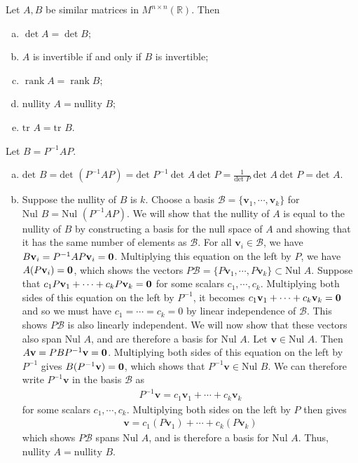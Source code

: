 \documentclass[12pt,letterpaper,reqno]{article}
\numberwithin{equation}{section}
\newcommand{\R}{\ensuremath{\mathbb R}}
\newcommand{\bv}{\mathbf{v}}
\newcommand{\nullity}{\text{nullity }}
\DeclareMathOperator{\rank}{rank}
\begin{document}
\begin{thm}\label{thm:similarity_invariants}
	Let $A,B$ be similar matrices in $M^{n \times n}(\R)$. Then
	\begin{enumerate}[(a)]
		\item $\det A=\det B$;
		\item $A$ is invertible if and only if $B$ is invertible;
		\item $\rank A= \rank B$;
		\item $\nullity A=\nullity B$;
		\item $\text{tr } A=\text{tr } B$.
	\end{enumerate}
\end{thm}

\newpage

\begin{pf}
Let $B=P^{-1}AP$.
	\begin{enumerate}[(a)]
		\item $\text{det }B=\text{det }(P^{-1}AP)=\text{det }P^{-1} \ \text{det }A \ \text{det }P=\frac{1}{\text{det }P} \ \text{det }A \ \text{det }P=\text{det }A$.
		\item Suppose the nullity of $B$ is $k$. Choose a basis $\mathcal{B}=\{\bv_1, \cdots, \bv_k\}$ for $\text{Nul }B=\text{Nul }(P^{-1}AP)$. We will show  that the nullity of $A$ is equal to the nullity of $B$ by constructing a basis for the null space of $A$ and showing that it has the same number of elements as $\mathcal{B}$. For all $\bv_i \in \mathcal{B}$, we have $B\bv_i=P^{-1}AP\bv_i={\bf 0}$. Multiplying this equation on the left by $P$, we have $A(P\bv_i)={\bf 0}$, which shows the vectors $P\mathcal{B}=\{P\bv_1,\cdots,P\bv_k\} \subset \text{Nul }A$. Suppose that $c_1P\bv_1+\cdots + c_kP\bv_k={\bf 0}$ for some scalars $c_1,\cdots, c_k$. Multiplying both sides of this equation on the left by $P^{-1}$, it becomes $c_1\bv_1+\cdots+c_k\bv_k={\bf 0}$ and so we must have $c_1=\cdots=c_k=0$ by linear independence of $\mathcal{B}$. This shows $P\mathcal{B}$ is also linearly independent. We will now show that these vectors also span $\text{Nul }A$, and are therefore a basis for $\text{Nul }A$. Let $\bv \in \text{Nul }A$. Then $A\bv=PBP^{-1}\bv={\bf 0}$. Multiplying both sides of this equation on the left by $P^{-1}$ gives $B(P^{-1}\bv)={\bf 0}$, which shows that $P^{-1}\bv \in \text{Nul }B$. We can therefore write $P^{-1}\bv$ in the basis $\mathcal{B}$ as 
		\begin{align*}
			P^{-1}\bv=c_1\bv_1+\cdots+c_k\bv_k
		\end{align*}
		for some scalars $c_1,\cdots,c_k$. Multiplying both sides on the left by $P$ then gives
		\begin{align*}
			\bv = c_1(P\bv_1)+\cdots+c_k(P\bv_k)
		\end{align*}
		which shows $P\mathcal{B}$ spans $\text{Nul }A$, and is therefore a basis for $\text{Nul }A$. Thus, $\text{nullity }A=\text{nullity }B$.
	

\end{enumerate}
\end{pf}
\end{document}
